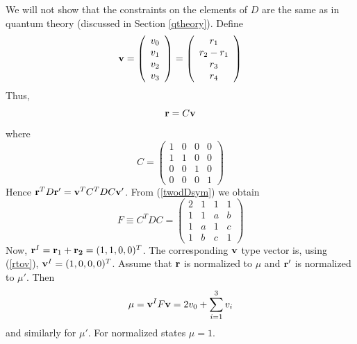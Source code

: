 \documentclass[12pt]{article}
\begin{document}
We will not show that the constraints on the elements of $D$ are the
same as in quantum theory (discussed in Section \ref{qtheory}).
Define
\begin{equation}\label{rtov}
{\bf v} = \left( \begin{array}{c} v_0 \\ v_1 \\ v_2 \\ v_3 \end{array}
\right) = \left( \begin{array}{c} r_1 \\ r_2-r_1 \\ r_3 \\ r_4 \end{array}
\right) \end{equation}
Thus,
\begin{equation}
{\bf r} = C {\bf v}
\end{equation}
where
\begin{equation}
         C=\left( \begin{array}{cccc} 1 & 0 & 0 & 0 \\
                                     1 & 1 & 0 & 0 \\
                                     0 & 0 & 1 & 0 \\
                                     0 & 0 & 0 & 1  \end{array}
                                     \right)
\end{equation}
Hence ${\bf r}^T D {\bf r}' = {\bf v}^T C^TDC {\bf v}'$.  From
(\ref{twodDsym}) we obtain
\begin{equation}
F\equiv C^TDC =\left( \begin{array}{cccc} 2 &  1 &  1 & 1  \\
                             1 &  1 &   a  &  b  \\
                             1&  a &  1 &  c  \\
                            1 &  b &  c&  1   \end{array} \right)
\end{equation}
Now, ${\bf r}^I={\bf r}_1+{\bf r_2}=(1, 1, 0, 0)^T$.
The corresponding ${\bf v}$ type
vector is, using (\ref{rtov}), ${\bf v}^I= (1 , 0, 0, 0)^T$.  Assume
that ${\bf r}$ is normalized to $\mu$ and ${\bf r}'$ is normalized to
$\mu'$.  Then
\begin{equation}\label{vnorm}
\mu = {\bf v}^I F {\bf v} = 2v_0 + \sum_{i=1}^3 v_i
\end{equation}
and similarly for $\mu'$.  For normalized states $\mu=1$.
\end{document}
